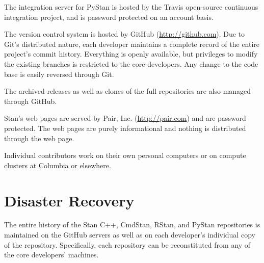 The integration server for PyStan is hosted by the Travis open-source
continuous integration project, and is password protected on an
account basis.

The version control system is hosted by GitHub
(\url{http://github.com}). Due to Git's distributed nature, each
developer maintains a complete record of the entire project's commit
history. Everything is openly available, but privileges to modify the
existing branches is restricted to the core developers. Any change to
the code base is easily reversed through Git.

The archived releases as well as clones of the full repositories are
also managed through GitHub.

Stan's web pages are served by Pair, Inc. (\url{http://pair.com}) and
are password protected.  The web pages are purely informational and
nothing is distributed through the web page.

Individual contributors work on their own personal computers or on
compute clusters at Columbia or elsewhere.


\section{Disaster Recovery}

The entire history of the Stan C++, CmdStan, RStan, and PyStan
repositories is maintained on the GitHub servers as well as on each
developer's individual copy of the repository. Specifically, each
repository can be reconstituted from any of the core 
developers' machines.

